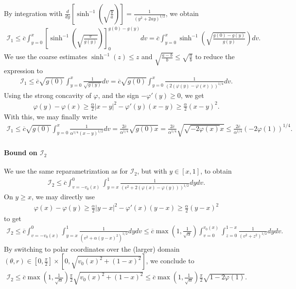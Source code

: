 \documentclass{article}
\numberwithin{equation}{section}
\newcommand{\DomUpL}{{\mathcal{D}_1}} %
\newcommand{\DomUpR}{{\mathcal{D}_2}} %
\newcommand{\IntUpL}{{\mathcal{I}_1}} %
\newcommand{\IntUpR}{{\mathcal{I}_2}} %
\newcommand{\maxfe}{{\overline{c}}} %
\begin{document}
By integration with $\frac{d}{dy} [\sinh^{-1}\left(\sqrt{\frac{y}{a}}\right)] = \frac{1}{(y^2 + 2 a y)^{1/2}}$, we obtain
\begin{align*}
	\IntUpL \leqslant \maxfe \int_{y=0}^{x} \left[\sinh^{-1}\left(\sqrt{\frac{v}{g(y)}}\right)\right]^{g(0)-g(y)}_{0} dv = \maxfe \int_{y=0}^{x} \sinh^{-1}\left(\sqrt{\frac{g(0)-g(y)}{g(y)}}\right) dv.
\end{align*}
We use the coarse estimates $\sinh^{-1}(z) \leqslant z$ and $\sqrt{\frac{a-b}{b}} \leqslant \sqrt{\frac{a}{b}}$ to reduce the expression to
\begin{align*}
	\IntUpL \leqslant \maxfe \sqrt{g(0)} \int_{y=0}^{x} \frac{1}{\sqrt{g(y)}} dv = \maxfe \sqrt{g(0)} \int_{y=0}^{x} \frac{1}{\left(2\left(\varphi(y) - \varphi(x)\right)\right)^{1/4}} dv.
\end{align*}
Using the strong concavity of $\varphi$, and the sign $-\varphi'(y) \geqslant 0$, we get
\begin{align*}
	\varphi(y) - \varphi(x) \geqslant \frac{\alpha}{2} |x - y|^2 - \varphi'(y)(x-y) \geqslant \frac{\alpha}{2} (x - y)^2.
\end{align*}
With this, we may finally write
\begin{align*}
	\IntUpL \leqslant \maxfe \sqrt{g(0)} \int_{y=0}^{x} \frac{1}{\alpha^{1/4}\left(x-y\right)^{1/2}} dv = \frac{2 \maxfe}{\alpha^{1/4}} \sqrt{g(0) x} = \frac{2 \maxfe}{\alpha^{1/4}} \sqrt{\sqrt{-2\varphi(x)} x} \leqslant \frac{2 \maxfe}{\alpha^{1/4}} \left(-2\varphi(1)\right)^{1/4}.
\end{align*}

\paragraph{Bound on $\IntUpR$}

We use the same reparametrization as for $\IntUpR$, but with $y \in [x,1]$, to obtain
\begin{align*}
	\IntUpR \leqslant \maxfe \int_{v=-v_0(x)}^{0} \int_{y=x}^{1} \frac{1}{\left(v^2 + 2(\varphi(x) - \varphi(y))\right)^{1/2}} dy dv.
\end{align*}
On $y \geqslant x$, we may directly use
\begin{align*}
	\varphi(x) - \varphi(y) \geqslant \frac{\alpha}{2} |y - x|^2 - \varphi'(x) (y-x) \geqslant \frac{\alpha}{2} (y - x)^2
\end{align*}
to get
\begin{align*}
	\IntUpR \leqslant \maxfe \int_{v=-v_0(x)}^{0} \int_{y=x}^{1} \frac{1}{\left(v^2 + \alpha(y-x)^2\right)^{1/2}} dy dv \leqslant \maxfe \max\left(1,\frac{1}{\sqrt{\alpha}}\right) \int_{v=0}^{v_0(x)} \int_{z=0}^{1-x} \frac{1}{\left(v^2 + z^2\right)^{1/2}} dy dv.
\end{align*}
By switching to polar coordinates over the (larger) domain $(\theta,r) \in [0,\frac{\pi}{2}] \times [0,\sqrt{v_0(x)^2 + (1-x)^2}]$, we conclude to 
\begin{align*}
	\IntUpR \leqslant \maxfe \max\left(1,\frac{1}{\sqrt{\alpha}}\right) \frac{\pi}{2} \sqrt{v_0(x)^2 + (1-x)^2} \leqslant \maxfe \max\left(1,\frac{1}{\sqrt{\alpha}}\right) \frac{\pi}{2} \sqrt{1 - 2\varphi(1)}.
\end{align*} 
\end{document}
